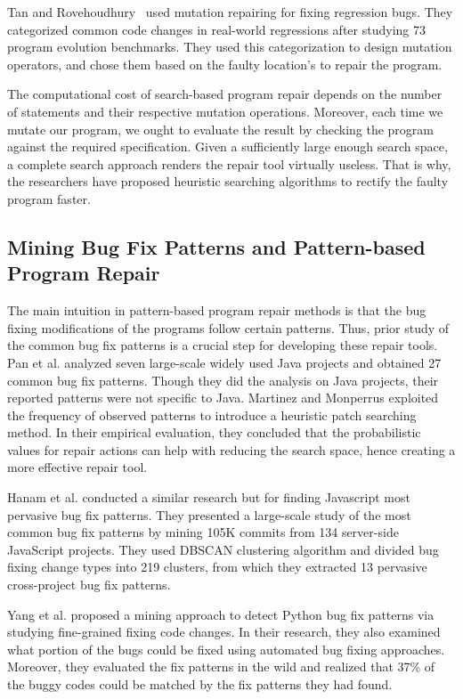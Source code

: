 Tan and Rovehoudhury~\cite{tan2015relifix} used mutation repairing for fixing regression bugs. They categorized common code changes in real-world regressions after studying 73 program evolution benchmarks. They used this categorization to design mutation operators, and chose them based on the faulty location’s to repair the program.

The computational cost of search-based program repair depends on the number of statements and their respective mutation operations. Moreover, each time we mutate our program, we ought to evaluate the result by checking the program against the required specification. Given a sufficiently large enough search space, a complete search approach renders the repair tool virtually useless. That is why, the researchers have proposed heuristic searching algorithms to rectify the faulty program faster.

\subsection{Mining Bug Fix Patterns and Pattern-based Program Repair}

The main intuition in pattern-based program repair methods is that the bug fixing modifications of the programs follow certain patterns. Thus, prior study of the common bug fix patterns is a crucial step for developing these repair tools. Pan et al. \cite{pan2009toward} analyzed seven large-scale widely used Java projects and obtained 27 common bug fix patterns. Though they did the analysis on Java projects, their reported patterns were not specific to Java. Martinez and Monperrus \cite{martinez2015mining} \cite{martinez2012mining} exploited the frequency of observed patterns to introduce a heuristic patch searching method. In their empirical evaluation, they concluded that the probabilistic values for repair actions can help with reducing the search space, hence creating a more effective repair tool.

Hanam et al. \cite{hanam2016discovering} conducted a similar research but for finding Javascript most pervasive bug fix patterns. They presented a large-scale study of the most common bug fix patterns by mining 105K commits from 134 server-side JavaScript projects. They used DBSCAN clustering algorithm and divided bug fixing change types into 219 clusters, from which they extracted 13 pervasive cross-project bug fix patterns. 

Yang et al. \cite{yang2022mining} proposed a mining approach to detect Python bug fix patterns via studying fine-grained fixing code changes. In their research, they also examined what portion of the bugs could be fixed using automated bug fixing approaches. Moreover, they evaluated the fix patterns in the wild and realized that 37\% of the buggy codes could be matched by the fix patterns they had found. 

